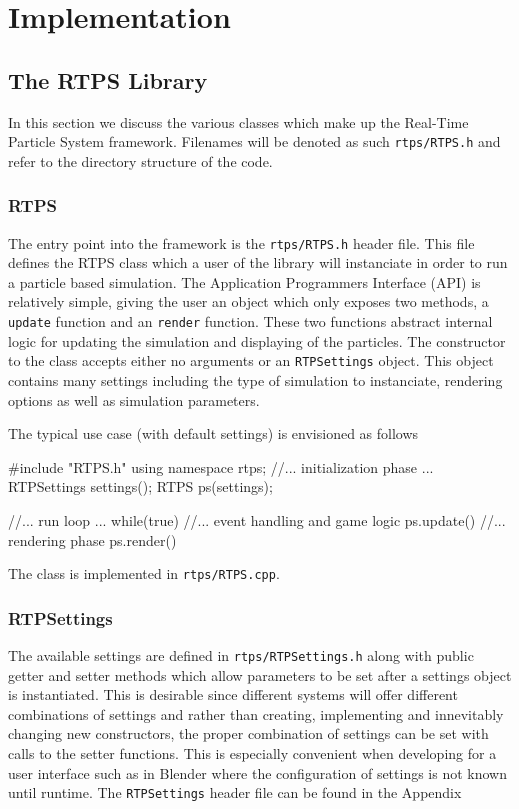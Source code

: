 \chapter{Implementation}

\section{The RTPS Library}

In this section we discuss the various classes which make up the Real-Time Particle System framework. Filenames will be denoted as such \verb|rtps/RTPS.h| and refer to the directory structure of the code. 

\subsection{RTPS}

The entry point into the framework is the \verb|rtps/RTPS.h| header file. This file defines
the RTPS class which a user of the library will instanciate in order to run a
particle based simulation. The Application Programmers Interface (API) is
relatively simple, giving the user an object which only exposes two methods, a
\verb|update| function and an \verb|render| function. These two functions abstract
internal logic for updating the simulation and displaying of the particles. The
constructor to the class accepts either no arguments or an \verb|RTPSettings| object.
This object contains many settings including the type of simulation to
instanciate, rendering options as well as simulation parameters. 

The typical use case (with default settings) is envisioned as follows
\begin{cppcode}{0}
#include "RTPS.h"
using namespace rtps;
//... initialization phase ...
RTPSettings settings();
RTPS ps(settings);

//... run loop ...
while(true)
{
    //... event handling and game logic
    ps.update()
    //... rendering phase
    ps.render()
}

\end{cppcode}

The class is implemented in \verb|rtps/RTPS.cpp|.

\subsection{RTPSettings}

The available settings are defined in \verb|rtps/RTPSettings.h| along with
public getter and setter methods which allow parameters to be set after a
settings object is instantiated. This is desirable since different systems will
offer different combinations of settings and rather than creating, implementing
and innevitably changing new constructors, the proper combination of settings
can be set with calls to the setter functions. This is especially convenient
when developing for a user interface such as in Blender where the configuration
of settings is not known until runtime. 
The \verb|RTPSettings| header file can be found in the Appendix


